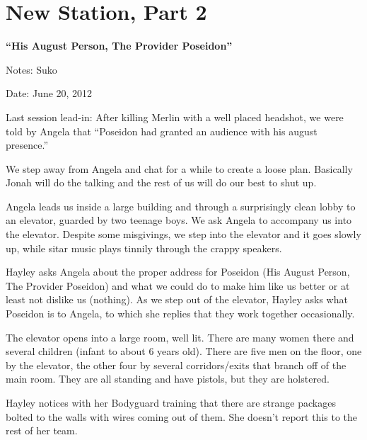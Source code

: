 \setcounter{chapter}{ 1 }
\chapter{\textbf{New Station, Part 2} }




\begin{center}
 {\LARGE \textbf{``His August Person, The Provider Poseidon''} } 
\end{center}




Notes: Suko

Date: June 20, 2012

\noindent\hrulefill





Last session lead-in: After killing Merlin with a well placed headshot, we were told by Angela that ``Poseidon had granted an audience with his august presence.''



We step away from Angela and chat for a while to create a loose plan.  Basically Jonah will do the talking and the rest of us will do our best to shut up.



Angela leads us inside a large building and through a surprisingly clean lobby to an elevator, guarded by two teenage boys.  We ask Angela to accompany us into the elevator.  Despite some misgivings, we step into the elevator and it goes slowly up, while sitar music plays tinnily through the crappy speakers.



Hayley asks Angela about the proper address for Poseidon (His August Person, The Provider Poseidon) and what we could do to make him like us better or at least not dislike us (nothing).  As we step out of the elevator, Hayley asks what Poseidon is to Angela, to which she replies that they work together occasionally.



The elevator opens into a large room, well lit.  There are many women there and several children (infant to about 6 years old).  There are five men on the floor, one by the elevator, the other four by several corridors/exits that branch off of the main room.  They are all standing and have pistols, but they are holstered.



Hayley notices with her Bodyguard training that there are strange packages bolted to the walls with wires coming out of them.  She doesn't report this to the rest of her team.



